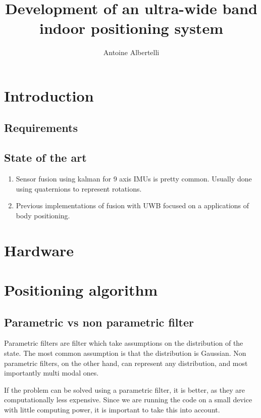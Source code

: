 \documentclass[a4paper]{scrreprt}
\title{Development of an ultra-wide band indoor positioning system}
\author{Antoine Albertelli}
\begin{document}

\maketitle
\tableofcontents

\chapter{Introduction}

\section{Requirements}

\section{State of the art}

\begin{enumerate}
    \item Sensor fusion using kalman for 9 axis IMUs is pretty common.
        Usually done using quaternions to represent rotations.
    \item Previous implementations of fusion with UWB focused on a applications of body positioning.
\end{enumerate}

\chapter{Hardware}

\chapter{Positioning algorithm}

\section{Parametric vs non parametric filter}

Parametric filters are filter which take assumptions on the distribution of the state.
The most common assumption is that the distribution is Gaussian.
Non parametric filters, on the other hand, can represent any distribution, and most importantly multi modal ones.

If the problem can be solved using a parametric filter, it is better, as they are computationally less expensive.
Since we are running the code on a small device with little computing power, it is important to take this into account.
\end{document}
